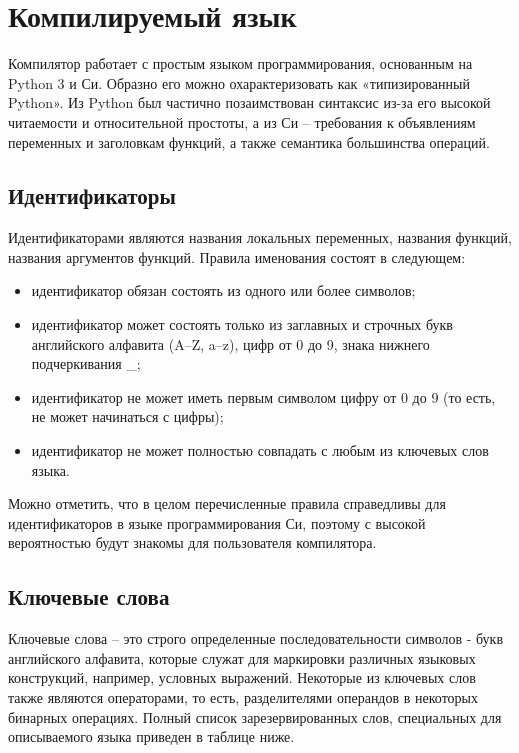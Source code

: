 \newpage
\section{Компилируемый язык}
\label{sec:language}

Компилятор работает с простым языком программирования, основанным на Python 3 и Си.
Образно его можно охарактеризовать как «типизированный Python».
Из Python был частично позаимствован синтаксис из-за его высокой читаемости и относительной простоты, а из Си -- требования к объявлениям переменных и заголовкам функций, а также семантика большинства операций.

\subsection{Идентификаторы}

Идентификаторами являются названия локальных переменных, названия функций, названия аргументов функций.
Правила именования состоят в следующем:

\begin{itemize}
    \item идентификатор обязан состоять из одного или более символов;
    \item идентификатор может состоять только из заглавных и строчных букв английского алфавита (A--Z, a--z), цифр от 0 до 9, знака нижнего подчеркивания \_;
    \item идентификатор не может иметь первым символом цифру от 0 до 9 (то есть, не может начинаться с цифры);
    \item идентификатор не может полностью совпадать с любым из ключевых слов языка.

\end{itemize}

Можно отметить, что в целом перечисленные правила справедливы для идентификаторов в языке программирования Си, поэтому с высокой вероятностью будут знакомы для пользователя компилятора.

\subsection{Ключевые слова}

Ключевые слова -- это строго определенные последовательности символов - букв английского алфавита, которые служат для маркировки различных языковых конструкций, например, условных выражений.
Некоторые из ключевых слов также являются операторами, то есть, разделителями операндов в некоторых бинарных операциях.
Полный список зарезервированных слов, специальных для описываемого языка приведен в таблице ниже.

